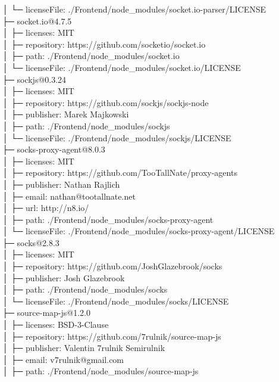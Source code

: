 │  └─ licenseFile: ./Frontend/node\_modules/socket.io-parser/LICENSE\\
├─ socket.io@4.7.5\\
│  ├─ licenses: MIT\\
│  ├─ repository: https://github.com/socketio/socket.io\\
│  ├─ path: ./Frontend/node\_modules/socket.io\\
│  └─ licenseFile: ./Frontend/node\_modules/socket.io/LICENSE\\
├─ sockjs@0.3.24\\
│  ├─ licenses: MIT\\
│  ├─ repository: https://github.com/sockjs/sockjs-node\\
│  ├─ publisher: Marek Majkowski\\
│  ├─ path: ./Frontend/node\_modules/sockjs\\
│  └─ licenseFile: ./Frontend/node\_modules/sockjs/LICENSE\\
├─ socks-proxy-agent@8.0.3\\
│  ├─ licenses: MIT\\
│  ├─ repository: https://github.com/TooTallNate/proxy-agents\\
│  ├─ publisher: Nathan Rajlich\\
│  ├─ email: nathan@tootallnate.net\\
│  ├─ url: http://n8.io/\\
│  ├─ path: ./Frontend/node\_modules/socks-proxy-agent\\
│  └─ licenseFile: ./Frontend/node\_modules/socks-proxy-agent/LICENSE\\
├─ socks@2.8.3\\
│  ├─ licenses: MIT\\
│  ├─ repository: https://github.com/JoshGlazebrook/socks\\
│  ├─ publisher: Josh Glazebrook\\
│  ├─ path: ./Frontend/node\_modules/socks\\
│  └─ licenseFile: ./Frontend/node\_modules/socks/LICENSE\\
├─ source-map-js@1.2.0\\
│  ├─ licenses: BSD-3-Clause\\
│  ├─ repository: https://github.com/7rulnik/source-map-js\\
│  ├─ publisher: Valentin 7rulnik Semirulnik\\
│  ├─ email: v7rulnik@gmail.com\\
│  ├─ path: ./Frontend/node\_modules/source-map-js\\
